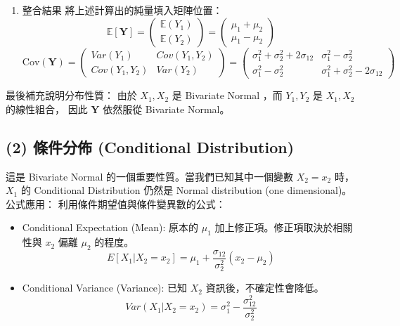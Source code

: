 \documentclass{article}
\begin{document}
\begin{enumerate}
    \begin{align*}
        Cov(Y_1, Y_2) &= \sigma_1^2 - \sigma_{12} + \sigma_{12} - \sigma_2^2 \\
        &= \sigma_1^2 - \sigma_2^2
    \end{align*}
    \item 整合結果
    將上述計算出的純量填入矩陣位置：
    \[
    \mathbb{E}[\bm Y] = 
    \begin{pmatrix} 
        \mathbb{E}(Y_1) \\ \mathbb{E}(Y_2) 
    \end{pmatrix} = 
    \begin{pmatrix} 
        \mu_1 + \mu_2 \\ \mu_1 - \mu_2 
    \end{pmatrix}
    \]
    \[
    \mathrm{Cov}(\bm Y) = 
    \begin{pmatrix} 
        Var(Y_1) &Cov(Y_1, Y_2)\\ 
        Cov(Y_1, Y_2) &Var(Y_2)
    \end{pmatrix}
    =
    \begin{pmatrix} 
            \sigma_1^2 + \sigma_2^2 + 2\sigma_{12} &\sigma_1^2 - \sigma_2^2\\ 
            \sigma_1^2 - \sigma_2^2 &\sigma_1^2 + \sigma_2^2 - 2\sigma_{12}
    \end{pmatrix}
    \]
\end{enumerate}
最後補充說明分布性質：
由於 $X_1, X_2$ 是 Bivariate Normal ，而 $Y_1, Y_2$ 是 $X_1, X_2$ 的線性組合，
因此 $\bm Y$ 依然服從 Bivariate Normal。
\begin{center}
\end{center}
\subsection*{(2) 條件分佈 (Conditional Distribution)}
這是 Bivariate Normal 的一個重要性質。當我們已知其中一個變數 $X_2 = x_2$ 時，$X_1$ 
的 Conditional Distribution 仍然是 Normal distribution (one dimensional)。\\

公式應用： 利用條件期望值與條件變異數的公式：
\begin{itemize}
    \item Conditional Expectation (Mean):
    原本的 $\mu_1$ 加上修正項。修正項取決於相關性與 $x_2$ 偏離 $\mu_2$ 的程度。
    $$E[X_1|X_2=x_2] = \mu_1 + \frac{\sigma_{12}}{\sigma_2^2}(x_2 - \mu_2)$$
    \item Conditional Variance (Variance): 已知 $X_2$ 資訊後，不確定性會降低。
    $$Var(X_1|X_2=x_2) = \sigma_1^2 - \frac{\sigma_{12}^2}{\sigma_2^2}$$
\end{itemize}
\begin{center}
\end{center}
\end{document}
